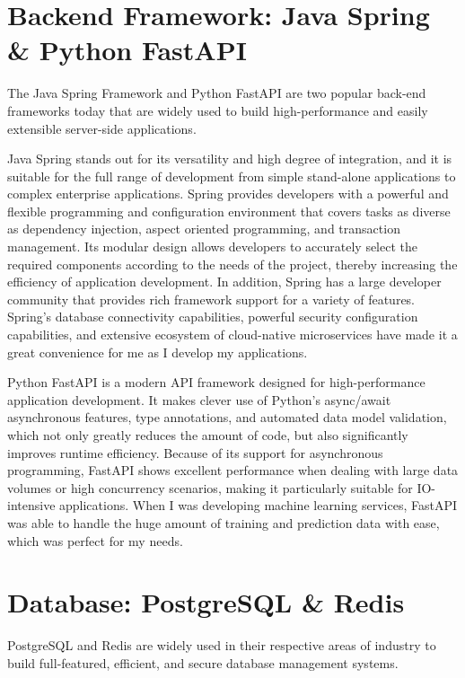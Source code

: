 \documentclass[12pt,two side]{report}
\begin{document}
\section{Backend Framework: Java Spring\cite{SpringFramework} \& Python FastAPI\cite{fastapi_website}}
The Java Spring Framework and Python FastAPI are two popular back-end frameworks today that are widely used to build high-performance and easily extensible server-side applications.\newline

Java Spring stands out for its versatility and high degree of integration, and it is suitable for the full range of development from simple stand-alone applications to complex enterprise applications. Spring provides developers with a powerful and flexible programming and configuration environment that covers tasks as diverse as dependency injection, aspect oriented programming, and transaction management. Its modular design allows developers to accurately select the required components according to the needs of the project, thereby increasing the efficiency of application development. In addition, Spring has a large developer community that provides rich framework support for a variety of features. Spring's database connectivity capabilities, powerful security configuration capabilities, and extensive ecosystem of cloud-native microservices have made it a great convenience for me as I develop my applications.\newline

Python FastAPI is a modern API framework designed for high-performance application development. It makes clever use of Python's async/await asynchronous features, type annotations, and automated data model validation, which not only greatly reduces the amount of code, but also significantly improves runtime efficiency. Because of its support for asynchronous programming, FastAPI shows excellent performance when dealing with large data volumes or high concurrency scenarios, making it particularly suitable for IO-intensive applications. When I was developing machine learning services, FastAPI was able to handle the huge amount of training and prediction data with ease, which was perfect for my needs.

\section{Database: PostgreSQL\cite{postgresql} \& Redis\cite{redis}}
PostgreSQL and Redis are widely used in their respective areas of industry to build full-featured, efficient, and secure database management systems.\newline
\end{document}

